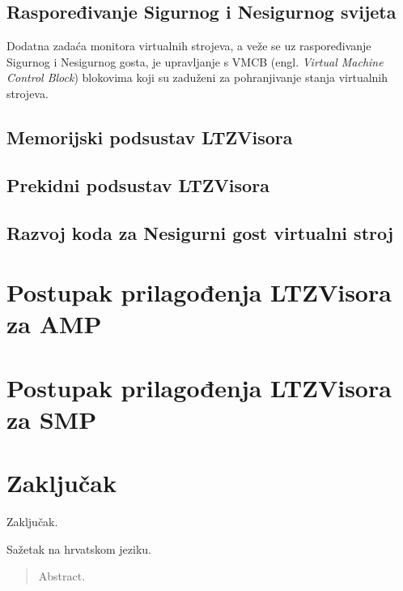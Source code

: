\documentclass[times, utf8, diplomski, numeric]{fer}
\begin{document}
\section{Raspoređivanje Sigurnog i Nesigurnog svijeta}
Dodatna zadaća monitora virtualnih strojeva, a veže se uz raspoređivanje Sigurnog i Nesigurnog gosta, je upravljanje s
VMCB (engl. \textit{Virtual Machine Control Block}) blokovima koji su zaduženi za pohranjivanje stanja virtualnih strojeva.

\section{Memorijski podsustav LTZVisora}
\section{Prekidni podsustav LTZVisora}
\section{Razvoj koda za Nesigurni gost virtualni stroj}

\chapter{Postupak prilagođenja LTZVisora za AMP}

\chapter{Postupak prilagođenja LTZVisora za SMP}

\chapter{Zaključak}
Zaključak.




\begin{sazetak}
Sažetak na hrvatskom jeziku.

\end{sazetak}

\begin{abstract}
Abstract.

\end{abstract}
\end{document}
